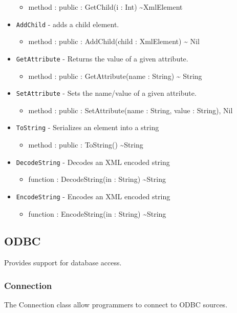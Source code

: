 \documentclass[11pt]{article}
\begin{document}
\begin{itemize}
  \begin{itemize}
  \item method : public : GetChild(i : Int) \textasciitilde XmlElement
  \end{itemize}
\item \texttt{AddChild} - adds a child element.
  \begin{itemize}
  \item method : public : AddChild(child : XmlElement) \textasciitilde
    Nil
  \end{itemize}
\item \texttt{GetAttribute} - Returns the value of a given attribute.
  \begin{itemize}
  \item method : public : GetAttribute(name : String) \textasciitilde
    String
  \end{itemize}
\item \texttt{SetAttribute} - Sets the name/value of a given
  attribute.
  \begin{itemize}
  \item method : public : SetAttribute(name : String, value : String),
    Nil
  \end{itemize}
\item \texttt{ToString} - Serializes an element into a string
  \begin{itemize}
  \item method : public : ToString() \textasciitilde String
  \end{itemize}
\item \texttt{DecodeString} - Decodes an XML encoded string
  \begin{itemize}
  \item function : DecodeString(in : String) \textasciitilde String
  \end{itemize}
\item \texttt{EncodeString} - Encodes an XML encoded string
  \begin{itemize}
  \item function : EncodeString(in : String) \textasciitilde String
  \end{itemize}
\end{itemize}

\subsection{ODBC}
Provides support for database access.

\subsubsection{Connection}
The Connection class allow programmers to connect to ODBC sources.
\end{document}
